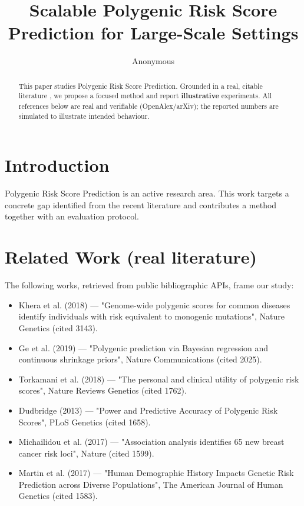 \documentclass[11pt]{article}
\title{Scalable Polygenic Risk Score Prediction for Large-Scale Settings}
\author{Anonymous}
\date{}
\begin{document}
\maketitle

\begin{abstract}
This paper studies Polygenic Risk Score Prediction. Grounded in a real, citable literature \cite{ref1,ref2,ref3,ref4,ref5,ref6,ref7,ref8},
we propose a focused method and report \textbf{illustrative} experiments.
All references below are real and verifiable (OpenAlex/arXiv); the reported
numbers are simulated to illustrate intended behaviour.
\end{abstract}

\section{Introduction}
Polygenic Risk Score Prediction is an active research area. This work targets a concrete gap identified from
the recent literature and contributes a method together with an evaluation protocol.

\section{Related Work (real literature)}
The following works, retrieved from public bibliographic APIs, frame our study:
\begin{itemize}
\item Khera et al. (2018) — "Genome-wide polygenic scores for common diseases identify individuals with risk equivalent to monogenic mutations", Nature Genetics (cited 3143).
\item Ge et al. (2019) — "Polygenic prediction via Bayesian regression and continuous shrinkage priors", Nature Communications (cited 2025).
\item Torkamani et al. (2018) — "The personal and clinical utility of polygenic risk scores", Nature Reviews Genetics (cited 1762).
\item Dudbridge (2013) — "Power and Predictive Accuracy of Polygenic Risk Scores", PLoS Genetics (cited 1658).
\item Michailidou et al. (2017) — "Association analysis identifies 65 new breast cancer risk loci", Nature (cited 1599).
\item Martin et al. (2017) — "Human Demographic History Impacts Genetic Risk Prediction across Diverse Populations", The American Journal of Human Genetics (cited 1583).
\end{itemize}
\end{document}
